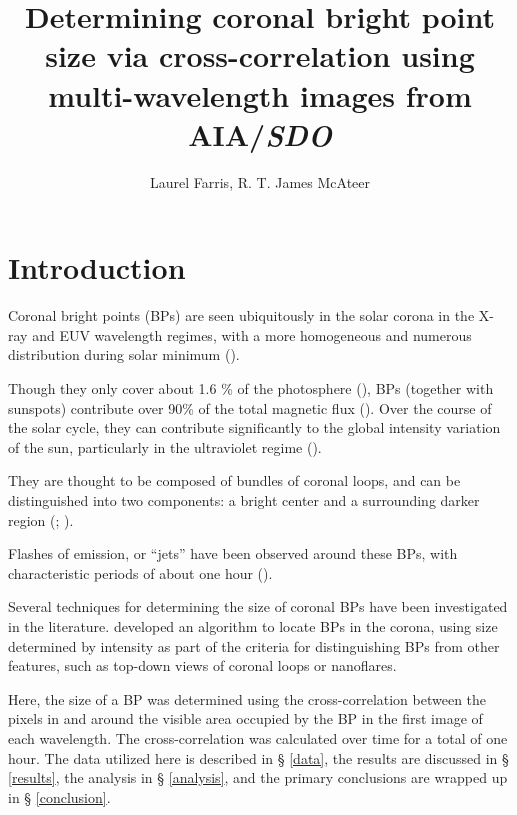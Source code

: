 \documentclass[preprint2]{aastex}
\begin{document}
\title{Determining coronal bright point size via cross-correlation using
multi-wavelength images from AIA/\textit{SDO}}
\author{Laurel Farris, R. T. James McAteer}

\begin{abstract}
\end{abstract}



\section{Introduction}\label{intro}


Coronal bright points (BPs)
are seen ubiquitously in the solar corona in the X-ray and EUV
wavelength regimes, with a more homogeneous and numerous distribution during
solar minimum (\cite{Priest}).

Though they only cover about 1.6 \% of the
photosphere (\cite{Srivastava}), BPs (together with sunspots)
contribute over 90\% of the total magnetic flux (\cite{Howard}).
Over the course of the solar cycle, they can contribute significantly to the
global intensity variation of the sun, particularly in the ultraviolet
regime (\cite{Riethmuller}).


They are thought to be composed of bundles of coronal loops, and can be
distinguished into two components: a bright center and a surrounding darker
region (\cite{Zhang}; \cite{Alipour}).

Flashes of emission, or ``jets'' have been observed around these BPs, with
characteristic periods of about one hour (\cite{Zhang}).


Several techniques for determining the size of coronal BPs have been investigated
in the literature.
\cite{Alipour} developed an algorithm to locate BPs in the corona, using size determined
by intensity as part of the criteria for distinguishing BPs from other features,
such as top-down views of coronal loops or nanoflares.


Here, the size of a BP was determined using
the cross-correlation between the pixels in and around the visible
area occupied by the BP in the first image of each wavelength.
The cross-correlation was calculated over time for a total of one hour.
The data utilized here is described in \S{} \ref{data},
the results are discussed in \S{} \ref{results},
the analysis in \S{} \ref{analysis},
and the primary conclusions are wrapped up in \S{} \ref{conclusion}.
\end{document}
